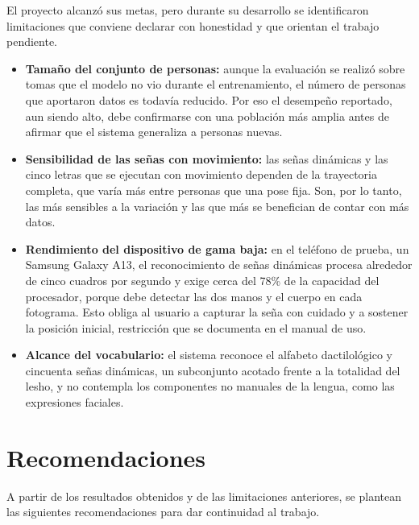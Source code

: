 El proyecto alcanzó sus metas, pero durante su desarrollo se identificaron limitaciones que conviene declarar con honestidad y que orientan el trabajo pendiente.

\begin{itemize}
    \item \textbf{Tamaño del conjunto de personas:} aunque la evaluación se realizó sobre tomas que el modelo no vio durante el entrenamiento, el número de personas que aportaron datos es todavía reducido. Por eso el desempeño reportado, aun siendo alto, debe confirmarse con una población más amplia antes de afirmar que el sistema generaliza a personas nuevas.
    \item \textbf{Sensibilidad de las señas con movimiento:} las señas dinámicas y las cinco letras que se ejecutan con movimiento dependen de la trayectoria completa, que varía más entre personas que una pose fija. Son, por lo tanto, las más sensibles a la variación y las que más se benefician de contar con más datos.
    \item \textbf{Rendimiento del dispositivo de gama baja:} en el teléfono de prueba, un Samsung Galaxy A13, el reconocimiento de señas dinámicas procesa alrededor de cinco cuadros por segundo y exige cerca del 78\% de la capacidad del procesador, porque debe detectar las dos manos y el cuerpo en cada fotograma. Esto obliga al usuario a capturar la seña con cuidado y a sostener la posición inicial, restricción que se documenta en el manual de uso.
    \item \textbf{Alcance del vocabulario:} el sistema reconoce el alfabeto dactilológico y cincuenta señas dinámicas, un subconjunto acotado frente a la totalidad del \Acrshort{lesho}, y no contempla los componentes no manuales de la lengua, como las expresiones faciales.
\end{itemize}

\section{Recomendaciones}

A partir de los resultados obtenidos y de las limitaciones anteriores, se plantean las siguientes recomendaciones para dar continuidad al trabajo.

